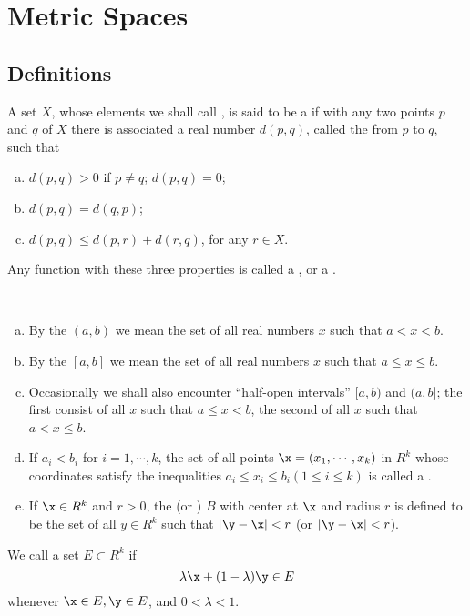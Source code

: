 \section{Metric Spaces}
\subsection{Definitions}
\begin{deff}
	A set $X$, whose elements we shall call {}, is said to be a {} if with any two points $p$ and $q$ of $X$ there is associated a real number $d(p,q)$, called the {} from $p$ to $q$, such that
	\begin{enumerate}[(a)]
		\item $d(p,q)>0$ if $p \ne q$; $d(p,q) = 0$;
		\item $d(p,q)=d(q,p)$;
		\item $d(p,q)\le d(p,r) + d(r,q)$, for any $r \in X$.
	\end{enumerate}
	Any function with these three properties is called a {}, or a {}.
\end{deff}

\begin{deff}
	~
	\begin{enumerate}[(a)]
	\item By the {} $(a,b)$ we mean the set of all real numbers $x$ such that $a<x<b$.
	\item By the {} $[a,b]$ we mean the set of all real numbers $x$ such that $a \le x \le b$.
	\item Occasionally we shall also encounter ``half-open intervals'' $[a,b)$ and $(a,b]$; the first consist of all $x$ such that $a \le x < b$, the second of all $x$ such that $a < x \le b$.
	\item If $a_i < b_i$ for $i = 1, \cdots, k$, the set of all points $\x = (x_1, \cdots, x_k)$ in $R^k$ whose coordinates satisfy the inequalities $a_i \le x_i \le b_i (1 \le i \le k)$ is called a {}.
	\item If $\x \in R^k$ and $r>0$, the {} (or {}) {} $B$ with center at $\x$ and radius $r$ is defined to be the set of all $y \in R^k$ such that $|\y - \x|<r$ (or $|\y - \x|<r$).
	\end{enumerate}
\end{deff}
\begin{deff}
	 We call a set $E \subset R^k$ {} if $$\lambda \x + (1-\lambda) \y \in E $$ whenever $\x \in E, \y \in E$, and $0<\lambda<1$.
\end{deff}

